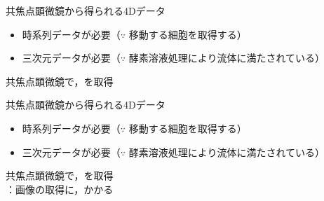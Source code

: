 \begin{frame}{共焦点顕微鏡から得られる4Dデータ}
    \begin{itemize}
        \item 時系列データが必要（$\because$ 移動する細胞を取得する）
        \item 三次元データが必要（$\because$ 酵素溶液処理により流体に満たされている）
    \end{itemize}
    \ra 共焦点顕微鏡\cite{paddock2000principles}で，を取得
    \\
\end{frame}
\begin{frame}[noframenumbering]{共焦点顕微鏡から得られる4Dデータ}
    \begin{itemize}
        \item 時系列データが必要（$\because$ 移動する細胞を取得する）
        \item 三次元データが必要（$\because$ 酵素溶液処理により流体に満たされている）
    \end{itemize}
    \ra 共焦点顕微鏡\cite{paddock2000principles}で，を取得
    \\\ra {}：画像の取得に，かかる
\end{frame}

